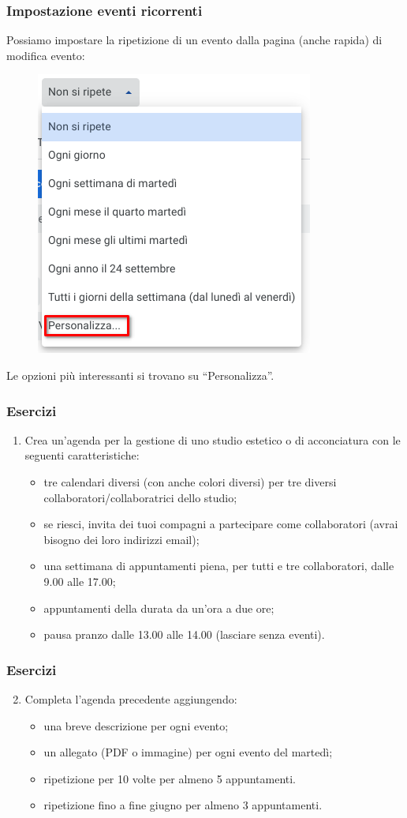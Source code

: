 \documentclass[handout]{beamer}
\begin{document}
\begin{frame}
\frametitle{Impostazione eventi ricorrenti}
Possiamo impostare la ripetizione di un evento dalla pagina (anche rapida) di modifica evento:
\begin{figure}
  \includegraphics[width=.4\columnwidth]{img/calendarricorrente.png}
\end{figure}
Le opzioni più interessanti si trovano su ``Personalizza''.
\end{frame}


\begin{frame}
\frametitle{Esercizi}
\begin{enumerate}
  \item Crea un'agenda per la gestione di uno studio estetico o di acconciatura con le seguenti caratteristiche:
  \begin{itemize}
    \item tre calendari diversi (con anche colori diversi) per tre diversi collaboratori/collaboratrici dello studio;
    \item se riesci, invita dei tuoi compagni a partecipare come collaboratori (avrai bisogno dei loro indirizzi email);
    \item una settimana di appuntamenti piena, per tutti e tre collaboratori, dalle 9.00 alle 17.00;
    \item appuntamenti della durata da un'ora a due ore;
    \item pausa pranzo dalle 13.00 alle 14.00 (lasciare senza eventi).
  \end{itemize}
\end{enumerate}
\end{frame}

\begin{frame}
  \frametitle{Esercizi}
  \begin{enumerate}\setcounter{enumi}{1}
    \item Completa l'agenda precedente aggiungendo:
    \begin{itemize}
      \item una breve descrizione per ogni evento;
      \item un allegato (PDF o immagine) per ogni evento del martedì;
      \item ripetizione per 10 volte per almeno 5 appuntamenti.
      \item ripetizione fino a fine giugno per almeno 3 appuntamenti.
    \end{itemize}
  \end{enumerate}
\end{frame}
\end{document}
